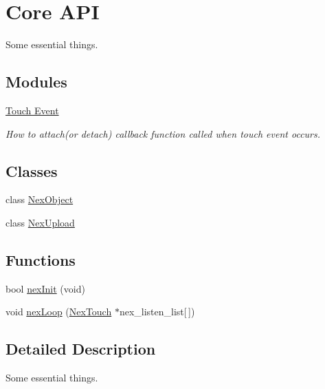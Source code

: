 \hypertarget{group___core_a_p_i}{\section{Core A\+P\+I}
\label{group___core_a_p_i}
}


Some essential things.  


\subsection*{Modules}
\begin{DoxyCompactItemize}
\item 
\hyperlink{group___touch_event}{Touch Event}
\begin{DoxyCompactList}\small\item\em How to attach(or detach) callback function called when touch event occurs. \end{DoxyCompactList}\end{DoxyCompactItemize}
\subsection*{Classes}
\begin{DoxyCompactItemize}
\item 
class \hyperlink{class_nex_object}{Nex\+Object}
\item 
class \hyperlink{class_nex_upload}{Nex\+Upload}
\end{DoxyCompactItemize}
\subsection*{Functions}
\begin{DoxyCompactItemize}
\item 
bool \hyperlink{group___core_a_p_i_gab09ddba6b72334d30ae091a7b038d790}{nex\+Init} (void)
\item 
void \hyperlink{group___core_a_p_i_ga91c549e696b0ca035cf18901e6a50d5a}{nex\+Loop} (\hyperlink{class_nex_touch}{Nex\+Touch} $\ast$nex\+\_\+listen\+\_\+list\mbox{[}$\,$\mbox{]})
\end{DoxyCompactItemize}


\subsection{Detailed Description}
Some essential things. 



